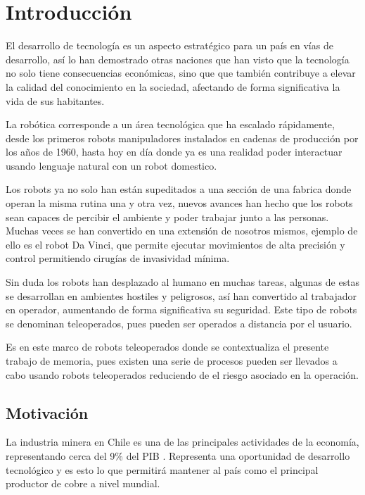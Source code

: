 \chapter{Introducción}

El desarrollo de tecnología es un aspecto estratégico para un país en vías de desarrollo, así lo han demostrado otras naciones que han visto que la tecnología no solo tiene consecuencias económicas, sino que que también contribuye a elevar la calidad del conocimiento en la sociedad, afectando de forma significativa la vida de sus habitantes.

La robótica corresponde a un área tecnológica que ha escalado rápidamente, desde los primeros robots manipuladores instalados en cadenas de producción por los años de 1960, hasta hoy en día donde ya es una realidad poder interactuar usando lenguaje natural con un robot domestico.

Los robots ya no solo han están supeditados a una sección de una fabrica donde operan la misma rutina una y otra vez, nuevos avances han hecho que los robots sean  capaces de percibir el ambiente y poder trabajar junto a las personas. Muchas veces se han convertido en una extensión de nosotros mismos, ejemplo de ello es el robot Da Vinci, que permite ejecutar movimientos de alta precisión y control permitiendo cirugías de invasividad mínima.

Sin duda los robots han desplazado al humano en muchas tareas, algunas de estas se desarrollan en ambientes hostiles y peligrosos, así han convertido al trabajador en operador, aumentando de forma significativa su seguridad. Este tipo de robots se denominan teleoperados, pues pueden ser operados a distancia por el usuario.

Es en este marco de robots teleoperados donde se contextualiza el presente trabajo de memoria, pues existen una serie de procesos pueden ser llevados a cabo usando robots teleoperados reduciendo de el riesgo asociado en la operación.

\section{Motivación}

La industria minera en Chile es una de las principales actividades de la economía, representando cerca del 9\% del PIB \cite{sofofa}. Representa una oportunidad de desarrollo tecnológico y es esto lo que permitirá mantener al país como el principal productor de cobre a nivel mundial.

